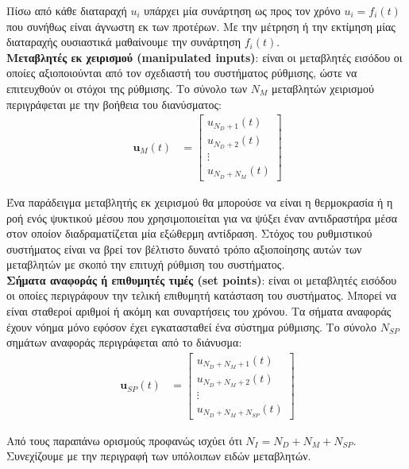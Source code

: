 \documentclass[11pt]{article} %
\numberwithin{equation}{subsection}
\begin{document}
Πίσω από κάθε διαταραχή $u_{i}$ υπάρχει μία συνάρτηση ως προς τον χρόνο $u_{i} = f_{i} (t)$ που συνήθως είναι άγνωστη εκ των προτέρων. Με την μέτρηση ή την εκτίμηση μίας διαταραχής ουσιαστικά μαθαίνουμε την συνάρτηση $f_{i} (t)$.\\

\textbf{Μεταβλητές εκ χειρισμού (manipulated inputs)}: είναι οι μεταβλητές εισόδου οι οποίες αξιοποιούνται από τον σχεδιαστή του συστήματος ρύθμισης, ώστε να επιτευχθούν οι στόχοι της ρύθμισης. Το σύνολο των $Ν_{Μ}$ μεταβλητών χειρισμού περιγράφεται με την βοήθεια του διανύσματος:
\begin{align*}
\
\textbf{u}_{M}(t) &= \begin{bmatrix}
           u_{N_{D}+1}(t) \\
           u_{N_{D}+2}(t) \\
           \vdots \\
           u_{N_{D} + N_{M}}(t)
         \end{bmatrix}
\end{align*}

Ένα παράδειγμα μεταβλητής εκ χειρισμού θα μπορούσε να είναι η θερμοκρασία ή η ροή ενός ψυκτικού μέσου που χρησιμοποιείται για να ψύξει έναν αντιδραστήρα μέσα στον οποίον διαδραματίζεται μία εξώθερμη αντίδραση. Στόχος του ρυθμιστικού συστήματος είναι να βρεί τον βέλτιστο δυνατό τρόπο αξιοποίησης αυτών των μεταβλητών με σκοπό την επιτυχή ρύθμιση του συστήματος.\\

\textbf{Σήματα αναφοράς ή επιθυμητές τιμές (set points)}: είναι οι μεταβλητές εισόδου οι οποίες περιγράφουν την τελική επιθυμητή κατάσταση του συστήματος. Μπορεί να είναι σταθεροί αριθμοί ή ακόμη και συναρτήσεις του χρόνου. Τα σήματα αναφοράς έχουν νόημα μόνο εφόσον έχει εγκατασταθεί ένα σύστημα ρύθμισης. Το σύνολο $Ν_{SP}$ σημάτων αναφοράς περιγράφεται από το διάνυσμα:
\begin{align*}
\
\textbf{u}_{SP}(t) &= \begin{bmatrix}
           u_{N_{D} + N_{M} + 1}(t) \\
           u_{N_{D} + N_{M} + 2}(t) \\
           \vdots \\
           u_{N_{D} + N_{M} + N_{SP}}(t)
         \end{bmatrix}
\end{align*}

Από τους παραπάνω ορισμούς προφανώς ισχύει ότι $Ν_{Ι} = Ν_{D} + N_{M} + N_{SP}$. Συνεχίζουμε με την περιγραφή των υπόλοιπων ειδών μεταβλητών.\\
\end{document}

